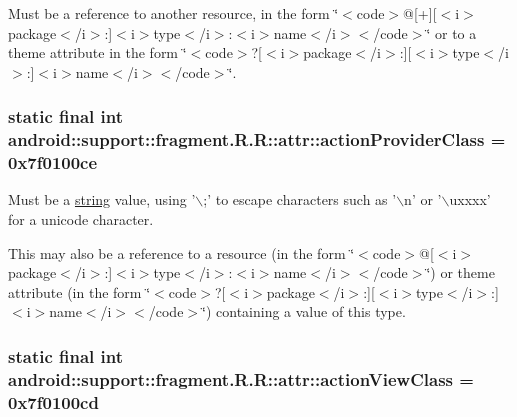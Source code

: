 Must be a reference to another resource, in the form \char`\"{}$<$code$>$@\mbox{[}+\mbox{]}\mbox{[}$<$i$>$package$<$/i$>$:\mbox{]}$<$i$>$type$<$/i$>$:$<$i$>$name$<$/i$>$$<$/code$>$\char`\"{} or to a theme attribute in the form \char`\"{}$<$code$>$?\mbox{[}$<$i$>$package$<$/i$>$:\mbox{]}\mbox{[}$<$i$>$type$<$/i$>$:\mbox{]}$<$i$>$name$<$/i$>$$<$/code$>$\char`\"{}. \hypertarget{classandroid_1_1support_1_1fragment_1_1_r_1_1attr_d9f9353a12455e598f1943d10d6d124f}{
\subsubsection[{actionProviderClass}]{\setlength{\rightskip}{0pt plus 5cm}static final int android::support::fragment.R.R::attr::actionProviderClass = 0x7f0100ce}}
\label{classandroid_1_1support_1_1fragment_1_1_r_1_1attr_d9f9353a12455e598f1943d10d6d124f}


Must be a \hyperlink{classandroid_1_1support_1_1fragment_1_1_r_1_1string}{string} value, using '$\backslash$;' to escape characters such as '$\backslash$n' or '$\backslash$uxxxx' for a unicode character. 

This may also be a reference to a resource (in the form \char`\"{}$<$code$>$@\mbox{[}$<$i$>$package$<$/i$>$:\mbox{]}$<$i$>$type$<$/i$>$:$<$i$>$name$<$/i$>$$<$/code$>$\char`\"{}) or theme attribute (in the form \char`\"{}$<$code$>$?\mbox{[}$<$i$>$package$<$/i$>$:\mbox{]}\mbox{[}$<$i$>$type$<$/i$>$:\mbox{]}$<$i$>$name$<$/i$>$$<$/code$>$\char`\"{}) containing a value of this type. \hypertarget{classandroid_1_1support_1_1fragment_1_1_r_1_1attr_bb593fe2a3d01f3a75de41653fefc8d7}{
\subsubsection[{actionViewClass}]{\setlength{\rightskip}{0pt plus 5cm}static final int android::support::fragment.R.R::attr::actionViewClass = 0x7f0100cd}}
\label{classandroid_1_1support_1_1fragment_1_1_r_1_1attr_bb593fe2a3d01f3a75de41653fefc8d7}


